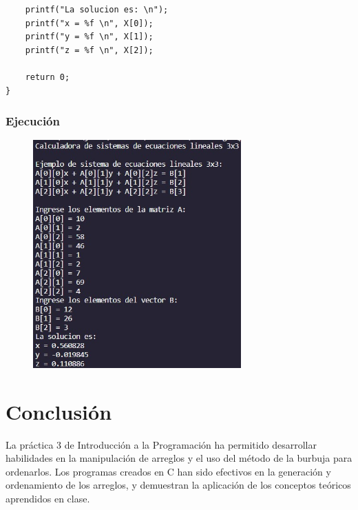 \documentclass{article}
\begin{document}
\begin{enumerate}
\begin{lstlisting}
	printf("La solucion es: \n");
	printf("x = %f \n", X[0]);
	printf("y = %f \n", X[1]);
	printf("z = %f \n", X[2]);
	
	return 0;
}
\end{lstlisting}

\subsubsection{Ejecución}

\begin{figure}[H]
	\centering
	\includegraphics[width = 8cm]{img3b.jpg}
\end{figure}

\end{enumerate}

\newpage

\section{Conclusión}

La práctica 3 de Introducción a la Programación ha permitido desarrollar habilidades en la manipulación de arreglos y el uso del método de la burbuja para ordenarlos. Los programas creados en C han sido efectivos en la generación y ordenamiento de los arreglos, y demuestran la aplicación de los conceptos teóricos aprendidos en clase.
\end{document}
